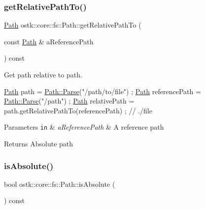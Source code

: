\subsubsection{\texorpdfstring{get\+Relative\+Path\+To()}{getRelativePathTo()}}
{\footnotesize\ttfamily \hyperlink{classostk_1_1core_1_1fs_1_1_path}{Path} ostk\+::core\+::fs\+::\+Path\+::get\+Relative\+Path\+To (\begin{DoxyParamCaption}\item[{const \hyperlink{classostk_1_1core_1_1fs_1_1_path}{Path} \&}]{a\+Reference\+Path }\end{DoxyParamCaption}) const}



Get path relative to path. 


\begin{DoxyCode}
\hyperlink{classostk_1_1core_1_1fs_1_1_path_a1a5fff28594542489223b4cfad6cc9fb}{Path} path = \hyperlink{classostk_1_1core_1_1fs_1_1_path_ad08539ba654f5df11c4bcb07276345ad}{Path::Parse}(\textcolor{stringliteral}{"/path/to/file"}) ;
\hyperlink{classostk_1_1core_1_1fs_1_1_path_a1a5fff28594542489223b4cfad6cc9fb}{Path} referencePath = \hyperlink{classostk_1_1core_1_1fs_1_1_path_ad08539ba654f5df11c4bcb07276345ad}{Path::Parse}(\textcolor{stringliteral}{"/path"}) ;
\hyperlink{classostk_1_1core_1_1fs_1_1_path_a1a5fff28594542489223b4cfad6cc9fb}{Path} relativePath = path.getRelativePathTo(referencePath) ; \textcolor{comment}{// ./file}
\end{DoxyCode}



\begin{DoxyParams}[1]{Parameters}
\mbox{\tt in}  & {\em a\+Reference\+Path} & A reference path \\
\hline
\end{DoxyParams}
\begin{DoxyReturn}{Returns}
Absolute path 
\end{DoxyReturn}
\mbox{\label{classostk_1_1core_1_1fs_1_1_path_a2e2b112358d457c0a1c193497c2c63da}} 
\subsubsection{\texorpdfstring{is\+Absolute()}{isAbsolute()}}
{\footnotesize\ttfamily bool ostk\+::core\+::fs\+::\+Path\+::is\+Absolute (\begin{DoxyParamCaption}{ }\end{DoxyParamCaption}) const}



